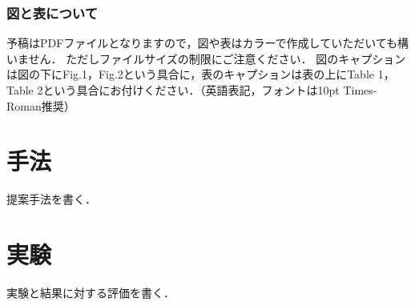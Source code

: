 \subsubsection{図と表について}
予稿はPDFファイルとなりますので，図や表はカラーで作成していただいても構いません．
ただしファイルサイズの制限にご注意ください．
図のキャプションは図の下にFig.1，Fig.2という具合に，表のキャプションは表の上にTable 1，Table 2という具合にお付けください．（英語表記，フォントは10pt Times-Roman推奨）
%
\section{手法}

提案手法を書く．

\section{実験}

実験と結果に対する評価を書く．
